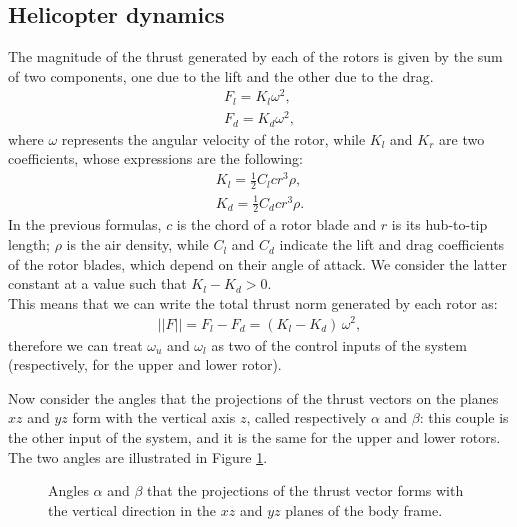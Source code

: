 \subsection{Helicopter dynamics}
The magnitude of the thrust generated by each of the rotors is given by the sum of two components, one due to the lift and the other due to the drag. 
\begin{gather*}
    F_l = K_l \omega^2, \\
    F_d = K_d \omega^2,
\end{gather*}
where $\omega$ represents the angular velocity of the rotor, while $K_l$ and $K_r$ are two coefficients, whose expressions are the following:
\begin{gather*}
    K_l = \frac{1}{2} C_l c r^3 \rho, \\
    K_d = \frac{1}{2} C_d c r^3 \rho.
\end{gather*}
In the previous formulas, $c$ is the chord of a rotor blade and $r$ is its hub-to-tip length; $\rho$ is the air density, while $C_l$ and $C_d$ indicate the lift and drag coefficients of the rotor blades, which depend on their angle of attack. We consider the latter constant at a value such that $K_l - K_d > 0$.\\
This means that we can write the total thrust norm generated by each rotor as:
\begin{gather}
    ||F|| = F_l - F_d = (K_l - K_d) \, \omega^2, \label{eq:force_norm}
\end{gather}
therefore we can treat $\omega_u$ and $\omega_l$ as two of the control inputs of the system (respectively, for the upper and lower rotor).

Now consider the angles that the projections of the thrust vectors on the planes $xz$ and $yz$ form with the vertical axis $z$, called respectively $\alpha$ and $\beta$: this couple is the other input of the system, and it is the same for the upper and lower rotors. The two angles are illustrated in Figure \ref{fig:alpha_beta}.

\begin{figure}[H]
    \centering
    \caption{Angles $\alpha$ and $\beta$ that the projections of the thrust vector forms with the vertical direction in the $xz$ and $yz$ planes of the body frame.}
    \label{fig:alpha_beta}
\end{figure}

